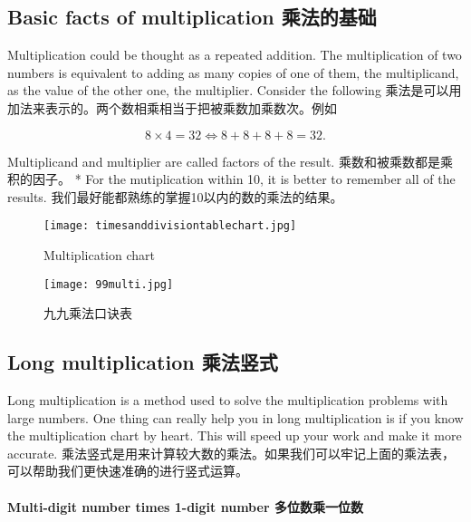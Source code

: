 \subsection{Basic facts of multiplication 乘法的基础}
\begin{paracol}{2}
Multiplication could be thought as a repeated addition. The multiplication of two numbers is equivalent to adding as many copies of one of them, the multiplicand, as the value of the other one, the multiplier. Consider the following
\switchcolumn[1]
乘法是可以用加法来表示的。两个数相乘相当于把被乘数加乘数次。例如
\end{paracol}
$$
8\times 4 = 32 \Leftrightarrow 8+8+8+8 = 32.
$$
\begin{paracol}{2}
Multiplicand and multiplier are called factors of the result. 
\switchcolumn[1]
乘数和被乘数都是乘积的因子。
\switchcolumn[0]*
For the mutiplication within 10, it is better to remember all of the results. 
\switchcolumn[1]
我们最好能都熟练的掌握10以内的数的乘法的结果。
\end{paracol}

\begin{figure}[!hbtp]
\centering
\texttt{[image: timesanddivisiontablechart.jpg]}
\caption{Multiplication chart\label{figur:multichart}}
\end{figure}


\begin{figure}[!hbtp]
\centering
\texttt{[image: 99multi.jpg]}
\caption{九九乘法口诀表\label{figur:multichart1}}
\end{figure}

\subsection{Long multiplication  乘法竖式}

\begin{paracol}{2}
Long multiplication is a method used to solve the multiplication problems with large numbers. One thing can really help you in long multiplication is if you know the multiplication chart by heart. This will speed up your work and make it more accurate. 
\switchcolumn[1]
乘法竖式是用来计算较大数的乘法。如果我们可以牢记上面的乘法表，可以帮助我们更快速准确的进行竖式运算。
\end{paracol}

\paragraph{Multi-digit number times 1-digit number 多位数乘一位数}
\ \ 


